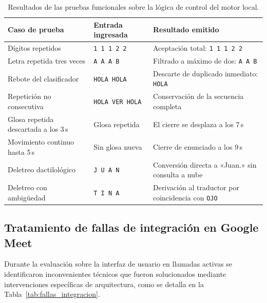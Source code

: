 \begin{table}[H]
    \centering
    \small
    \caption{Resultados de las pruebas funcionales sobre la lógica de control del motor local.}
    \label{tab:bateria_logica}
    \begin{tabularx}{\textwidth}{l l X}
        \toprule
        \textbf{Caso de prueba} & \textbf{Entrada ingresada} & \textbf{Resultado emitido} \\
        \midrule
        Dígitos repetidos & \texttt{1 1 1 2 2} & Aceptación total: \texttt{1 1 1 2 2} \\
        Letra repetida tres veces & \texttt{A A A B} & Filtrado a máximo de dos: \texttt{A A B} \\
        Rebote del clasificador & \texttt{HOLA HOLA} & Descarte de duplicado inmediato: \texttt{HOLA} \\
        Repetición no consecutiva & \texttt{HOLA VER HOLA} & Conservación de la secuencia completa \\
        Glosa repetida descartada a los 3\,s & Glosa repetida & El cierre se desplaza a los 7\,s \\
        Movimiento continuo hasta 5\,s & Sin glosa nueva & Cierre de enunciado a los 9\,s \\
        Deletreo dactilológico & \texttt{J U A N} & Conversión directa a «Juan.» sin consulta a nube \\
        Deletreo con ambigüedad & \texttt{T I N A} & Derivación al traductor por coincidencia con \texttt{OJO} \\
        \bottomrule
    \end{tabularx}
\end{table}

\subsection{Tratamiento de fallas de integración en Google Meet}
Durante la evaluación sobre la interfaz de usuario en llamadas activas se identificaron inconvenientes técnicos que fueron solucionados mediante intervenciones específicas de arquitectura, como se detalla en la Tabla~\ref{tab:fallas_integracion}.

